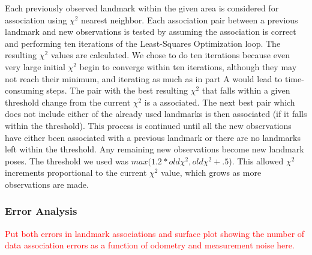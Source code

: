 \documentclass[12pt]{article}
\begin{document}
Each previously observed landmark within the given area is considered for association using $\chi^2$ nearest neighbor.  Each association pair between a previous landmark and new observations is tested by assuming the association is correct and performing ten iterations of the Least-Squares Optimization loop. The resulting $\chi^2$ values are calculated.  We chose to do ten iterations because even very large initial $\chi^2$ begin to converge within ten iterations, although they may not reach their minimum, and iterating as much as in part A would lead to time-consuming steps.  The pair with the best resulting $\chi^2$ that falls within a given threshold change from the current $\chi^2$ is a associated.  The next best pair which does not include either of the already used landmarks is then associated (if it falls within the threshold).  This process is continued until all the new observations have either been associated with a previous landmark or there are no landmarks left within the threshold.  Any remaining new observations become new landmark poses.  The threshold we used was $max(1.2*old\chi^2, old\chi^2 + .5$).  This allowed $\chi^2$ increments proportional to the current $\chi^2$ value, which grows as more observations are made.


\subsubsection*{Error Analysis}

\textcolor{red}{Put both errors in landmark associations and surface plot showing the number of data association errors as a function of odometry and measurement noise here.}
\end{document}
